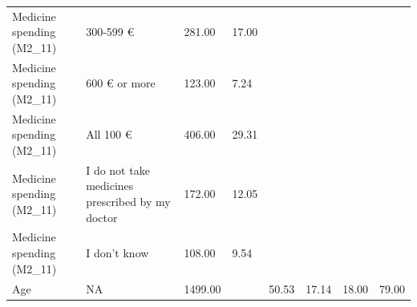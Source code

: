 \begin{tabular}{llllllll}
Medicine spending (M2\_11) & 300-599 € & \num{281.00} & \num{17.00} &  &  &  &  \\
Medicine spending (M2\_11) & 600 € or more & \num{123.00} & \num{7.24} &  &  &  &  \\
Medicine spending (M2\_11) & All 100 € & \num{406.00} & \num{29.31} &  &  &  &  \\
Medicine spending (M2\_11) & I do not take medicines prescribed by my doctor & \num{172.00} & \num{12.05} &  &  &  &  \\
Medicine spending (M2\_11) & I don't know & \num{108.00} & \num{9.54} &  &  &  &  \\
Age & NA & \num{1499.00} &  & \num{50.53} & \num{17.14} & \num{18.00} & \num{79.00} \\
\end{tabular}
